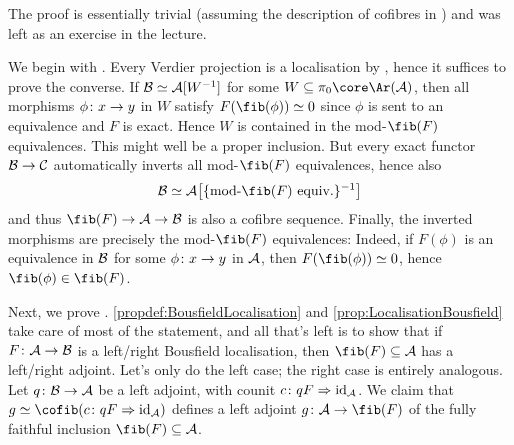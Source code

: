\documentclass[a4paper, 10pt, oneside, DIV=9, chapterprefix=true, numbers=enddot,bibliography=totoc]{scrbook}
\begin{document}
\begin{proof*}
	The proof is essentially trivial (assuming the description of cofibres in ) and was left as an exercise in the lecture.
	
	We begin with . Every Verdier projection is a localisation by , hence it suffices to prove the converse. If $\mathcal{B}\simeq \mathcal{A}[W^{-1}]$ for some $W\subseteq \pi_0\core\Ar(\Aa)$, then all morphisms $\phi\colon x\morphism y$ in $W$ satisfy $F(\fib(\phi))\simeq 0$ since $\phi$ is sent to an equivalence and $F$ is exact. Hence $W$ is contained in the mod-$\fib(F)$ equivalences. This might well be a proper inclusion. But every exact functor $\Bb\morphism \Cc$ automatically inverts all mod-$\fib(F)$ equivalences, hence also
	\begin{equation*}
		\Bb\simeq \Aa\big[\{\text{mod-$\fib(F)$ equiv.}\}^{-1}\big]
	\end{equation*}
	and thus $\fib(F)\morphism \Aa\morphism \Bb$ is also a cofibre sequence. Finally, the inverted morphisms are precisely the mod-$\fib(F)$ equivalences: Indeed, if $F(\phi)$ is an equivalence in $\mathcal{B}$ for some $\phi\colon x\morphism y$ in $\mathcal{A}$, then $F(\fib(\phi))\simeq 0$, hence $\fib(\phi)\in \fib(F)$.
	
	Next, we prove . \cref{propdef:BousfieldLocalisation} and \cref{prop:LocalisationBousfield} take care of most of the statement, and all that's left is to show that if $F\colon \Aa\morphism \Bb$ is a left/right Bousfield localisation, then $\fib(F)\subseteq \Aa$ has a left/right adjoint. Let's only do the left case; the right case is entirely analogous. Let $q\colon \Bb\morphism \Aa$ be a left adjoint, with counit $c\colon qF\Rightarrow \operatorname{id}_{\mathcal{A}}$. We claim that $g\simeq  \cofib(c\colon qF\Rightarrow \id_\Aa)$ defines a left adjoint $g\colon \Aa\morphism \fib(F)$ of the fully faithful inclusion $\fib(F)\subseteq \Aa$.
	

\end{proof*}
\end{document}
